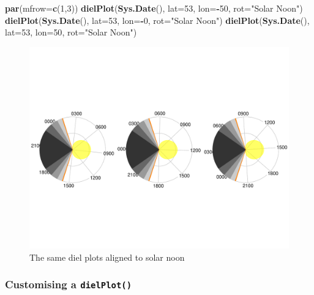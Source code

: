 \documentclass[
]{book}
\newenvironment{Shaded}{\begin{snugshade}}{\end{snugshade}}
\newcommand{\AttributeTok}[1]{\textcolor[rgb]{0.13,0.29,0.53}{#1}}
\newcommand{\DecValTok}[1]{\textcolor[rgb]{0.00,0.00,0.81}{#1}}
\newcommand{\FunctionTok}[1]{\textcolor[rgb]{0.13,0.29,0.53}{\textbf{#1}}}
\newcommand{\NormalTok}[1]{#1}
\newcommand{\SpecialCharTok}[1]{\textcolor[rgb]{0.81,0.36,0.00}{\textbf{#1}}}
\newcommand{\StringTok}[1]{\textcolor[rgb]{0.31,0.60,0.02}{#1}}
\begin{document}
\begin{Shaded}
\begin{Highlighting}[]
\FunctionTok{par}\NormalTok{(}\AttributeTok{mfrow=}\FunctionTok{c}\NormalTok{(}\DecValTok{1}\NormalTok{,}\DecValTok{3}\NormalTok{))}
\FunctionTok{dielPlot}\NormalTok{(}\FunctionTok{Sys.Date}\NormalTok{(), }\AttributeTok{lat=}\DecValTok{53}\NormalTok{, }\AttributeTok{lon=}\SpecialCharTok{{-}}\DecValTok{50}\NormalTok{, }\AttributeTok{rot=}\StringTok{"Solar Noon"}\NormalTok{)}
\FunctionTok{dielPlot}\NormalTok{(}\FunctionTok{Sys.Date}\NormalTok{(), }\AttributeTok{lat=}\DecValTok{53}\NormalTok{, }\AttributeTok{lon=}\SpecialCharTok{{-}}\DecValTok{0}\NormalTok{, }\AttributeTok{rot=}\StringTok{"Solar Noon"}\NormalTok{)}
\FunctionTok{dielPlot}\NormalTok{(}\FunctionTok{Sys.Date}\NormalTok{(), }\AttributeTok{lat=}\DecValTok{53}\NormalTok{, }\AttributeTok{lon=}\DecValTok{50}\NormalTok{, }\AttributeTok{rot=}\StringTok{"Solar Noon"}\NormalTok{)}
\end{Highlighting}
\end{Shaded}

\begin{figure}

{\centering \includegraphics[width=0.9\linewidth]{_main_files/figure-latex/diel-plot-sn-1} 

}

\caption{The same diel plots aligned to solar noon}\label{fig:diel-plot-sn}
\end{figure}

\hypertarget{customising-a-dielplot}{%
\subsubsection{\texorpdfstring{Customising a \texttt{dielPlot()}}{Customising a dielPlot()}}\label{customising-a-dielplot}}
\end{document}
